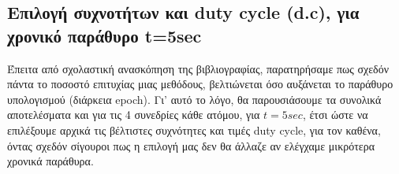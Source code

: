 \documentclass[11pt,a4paper,english,greek,twoside]{../Thesis}
\begin{document}
\subsection{Επιλογή συχνοτήτων και duty cycle (d.c), για χρονικό παράθυρο t=5sec}
\label{subsec:total_results}

\par Έπειτα από σχολαστική ανασκόπηση της βιβλιογραφίας, παρατηρήσαμε πως σχεδόν πάντα το ποσοστό επιτυχίας μιας μεθόδους, βελτιώνεται όσο αυξάνεται το παράθυρο υπολογισμού (διάρκεια epoch). Γι' αυτό το λόγο, θα παρουσιάσουμε τα συνολικά αποτελέσματα και για τις 4 συνεδρίες κάθε ατόμου, για $t=5sec$, έτσι ώστε να επιλέξουμε αρχικά τις βέλτιστες συχνότητες και τιμές duty cycle, για τον καθένα, όντας σχεδόν σίγουροι πως η επιλογή μας δεν θα άλλαζε αν ελέγχαμε μικρότερα χρονικά παράθυρα. 
\end{document}
